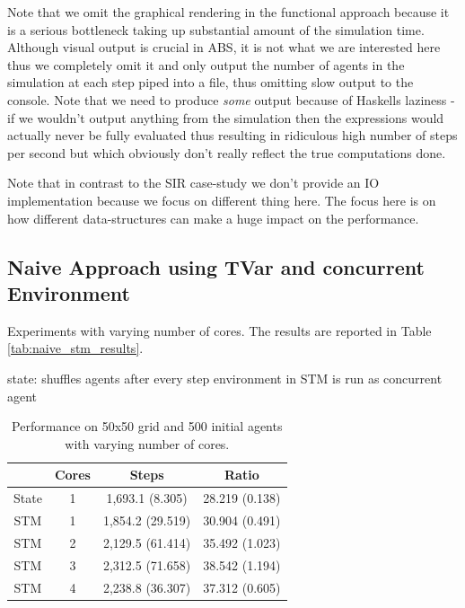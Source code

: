 Note that we omit the graphical rendering in the functional approach because it is a serious bottleneck taking up substantial amount of the simulation time. Although visual output is crucial in ABS, it is not what we are interested here thus we completely omit it and only output the number of agents in the simulation at each step piped into a file, thus omitting slow output to the console. Note that we need to produce \textit{some} output because of Haskells laziness - if we wouldn't output anything from the simulation then the expressions would actually never be fully evaluated thus resulting in ridiculous high number of steps per second but which obviously don't really reflect the true computations done.

Note that in contrast to the SIR case-study we don't provide an IO implementation because we focus on different thing here. The focus here is on how different data-structures can make a huge impact on the performance.

\subsection{Naive Approach using TVar and concurrent Environment}
Experiments with varying number of cores. The results are reported in Table \ref{tab:naive_stm_results}.

state: shuffles agents after every step
environment in STM is run as concurrent agent

\begin{table}
	\centering
  	\begin{tabular}{ c || c | c | c }
               & Cores & Steps            & Ratio          \\ \hline \hline 
    	State  & 1     & 1,693.1 (8.305)  & 28.219 (0.138) \\ \hline \hline
   		STM    & 1     & 1,854.2 (29.519) & 30.904 (0.491) \\ \hline
   		STM    & 2     & 2,129.5 (61.414) & 35.492 (1.023) \\ \hline
   		STM    & 3     & 2,312.5 (71.658) & 38.542 (1.194) \\ \hline
   		STM    & 4     & 2,238.8 (36.307) & 37.312 (0.605) \\ \hline
   	\end{tabular}
  	
  	\caption{Performance on 50x50 grid and 500 initial agents with varying number of cores.}
	\label{tab:naive_results_time}
\end{table}

